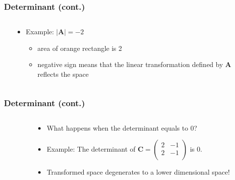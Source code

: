 \documentclass[pdflatex, 12pt]{beamer}
\begin{document}
\begin{frame}
\frametitle{Determinant (cont.)}
\begin{columns}
\begin{column}{0.5\textwidth}
\centering
{}
\end{column}
\begin{column}{0.5\textwidth}
\begin{itemize}
\item Example: $|\bm{A}| = -2$
 \begin{itemize}
 \item area of orange rectangle is 2
 \item negative sign means that the linear transformation defined by $\bm{A}$ reflects the space
 \end{itemize}
\end{itemize}
\end{column}
\end{columns}
\end{frame}

\begin{frame}
\frametitle{Determinant (cont.)}
\begin{columns}
\begin{column}{0.5\textwidth}
\centering
{}
\end{column}
\begin{column}{0.5\textwidth}
\begin{itemize}
\item What happens when the determinant equals to 0?
\vspace{0.4cm}
\item Example: The determinant of $\bm{C} = \begin{pmatrix}
 2 & -1 \\
 2 & -1 \\
 \end{pmatrix}$ is 0.
\vspace{0.4cm}
\item Transformed space degenerates to a lower dimensional space!
\end{itemize}
\end{column}
\end{columns}
\end{frame}
\end{document}
